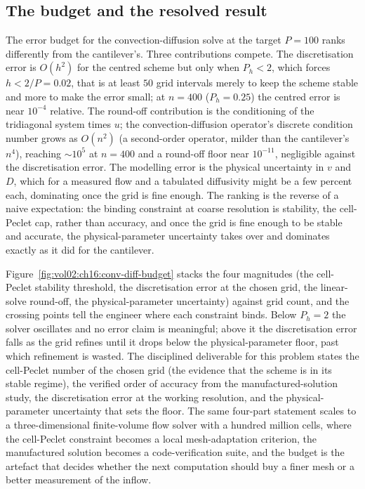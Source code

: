 \subsection{The budget and the resolved result}

The error budget for the convection-diffusion solve at the target $P = 100$
ranks differently from the cantilever's. Three contributions compete. The
discretisation error is $O(h^{2})$ for the centred scheme but only when
$P_{h} < 2$, which forces $h < 2/P = 0.02$, that is at least $50$ grid
intervals merely to keep the scheme stable and more to make the error small;
at $n = 400$ ($P_{h} = 0.25$) the centred error is near $10^{-4}$ relative.
The round-off contribution is the conditioning of the tridiagonal system
times $u$; the convection-diffusion operator's discrete condition number
grows as $O(n^{2})$ (a second-order operator, milder than the cantilever's
$n^{4}$), reaching $\sim 10^{5}$ at $n = 400$ and a round-off floor near
$10^{-11}$, negligible against the discretisation error. The modelling error
is the physical uncertainty in $v$ and $D$, which for a measured flow and a
tabulated diffusivity might be a few percent each, dominating once the grid
is fine enough. The ranking is the reverse of a naive expectation: the
binding constraint at coarse resolution is stability, the cell-Peclet cap,
rather than accuracy, and once the grid is fine enough to be stable and accurate,
the physical-parameter uncertainty takes over and dominates exactly as it did
for the cantilever.



Figure~\ref{fig:vol02:ch16:conv-diff-budget} stacks the four magnitudes (the
cell-Peclet stability threshold, the discretisation error at the chosen grid,
the linear-solve round-off, the physical-parameter uncertainty) against grid
count, and the crossing points tell the engineer where each constraint binds.
Below $P_{h} = 2$ the solver oscillates and no error claim is meaningful;
above it the discretisation error falls as the grid refines until it drops
below the physical-parameter floor, past which refinement is wasted. The
disciplined deliverable for this problem states the cell-Peclet number of the
chosen grid (the evidence that the scheme is in its stable regime), the
verified order of accuracy from the manufactured-solution study, the
discretisation error at the working resolution, and the physical-parameter
uncertainty that sets the floor. The same four-part statement scales to a
three-dimensional finite-volume flow solver with a hundred million cells,
where the cell-Peclet constraint becomes a local mesh-adaptation criterion,
the manufactured solution becomes a code-verification suite, and the budget
is the artefact that decides whether the next computation should buy a finer
mesh or a better measurement of the inflow.

